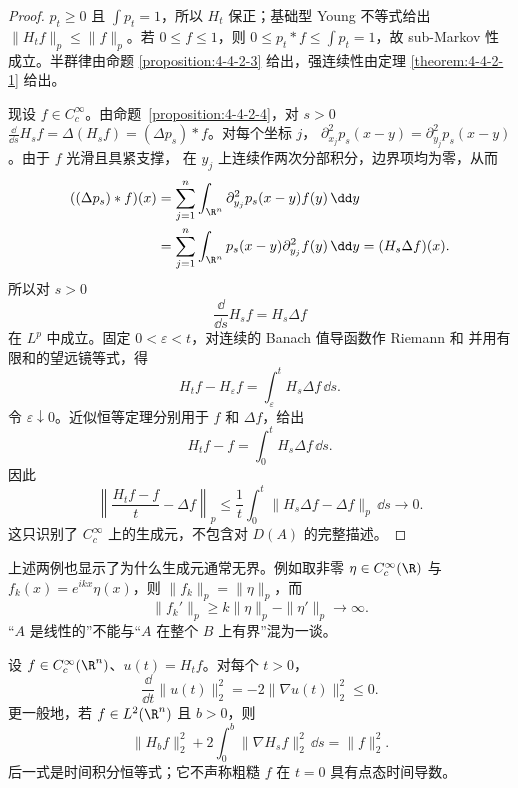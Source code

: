 \begin{proof}
$p_t\ge0$ 且 $\int p_t=1$，所以 $H_t$ 保正；基础型 Young 不等式给出
$\|H_tf\|_p\le\|f\|_p$。若 $0\le f\le1$，则
$0\le p_t*f\le\int p_t=1$，故 sub-Markov 性成立。半群律由命题
\ref{proposition:4-4-2-3} 给出，强连续性由定理
\ref{theorem:4-4-2-1} 给出。

现设 $f\in C_c^\infty$。由命题~\ref{proposition:4-4-2-4}，对 $s>0$
$\frac{\dd}{\dd s}H_sf=\Delta(H_sf)=(\Delta p_s)*f$。对每个坐标 $j$，
$\partial_{x_j}^2p_s(x-y)=\partial_{y_j}^2p_s(x-y)$。由于 $f$ 光滑且具紧支撑，
在 $y_j$ 上连续作两次分部积分，边界项均为零，从而
\begin{align*}
 ((\Delta p_s)*f)(x)
 &=\sum_{j=1}^n\int_{\R^n}
   \partial_{y_j}^2p_s(x-y)f(y)\,\dd y\\
 &=\sum_{j=1}^n\int_{\R^n}
   p_s(x-y)\partial_{y_j}^2f(y)\,\dd y
 =(H_s\Delta f)(x).
\end{align*}
所以对 $s>0$
\[
 \frac{\dd}{\dd s}H_sf=H_s\Delta f
\]
在 $L^p$ 中成立。固定 $0<\varepsilon<t$，对连续的 Banach 值导函数作 Riemann 和
并用有限和的望远镜等式，得
\[
 H_tf-H_\varepsilon f=\int_\varepsilon^tH_s\Delta f\,\dd s.
\]
令 $\varepsilon\downarrow0$。近似恒等定理分别用于 $f$ 和 $\Delta f$，给出
\begin{equation}\label{eq:4-4-3-heat-difference-integral}
 H_tf-f=\int_0^tH_s\Delta f\,\dd s.
\end{equation}
因此
\[
 \left\|\frac{H_tf-f}{t}-\Delta f\right\|_p
 \le\frac1t\int_0^t\|H_s\Delta f-\Delta f\|_p\,\dd s
 \longrightarrow0.
\]
这只识别了 $C_c^\infty$ 上的生成元，不包含对 $D(A)$ 的完整描述。
\end{proof}

上述两例也显示了为什么生成元通常无界。例如取非零
$\eta\in C_c^\infty(\R)$ 与 $f_k(x)=e^{ikx}\eta(x)$，则 $\|f_k\|_p=\|\eta\|_p$，而
\[
 \|f_k'\|_p\ge k\|\eta\|_p-\|\eta'\|_p\longrightarrow\infty.
\]
“$A$ 是线性的”不能与“$A$ 在整个 $B$ 上有界”混为一谈。

\begin{theorem}[热能量恒等式]\label{theorem:4-4-3-3}
设 $f\in C_c^\infty(\R^n)$、$u(t)=H_tf$。对每个 $t>0$，
\[
 \frac{\dd}{\dd t}\|u(t)\|_2^2
 =-2\|\nabla u(t)\|_2^2\le0.
\]
更一般地，若 $f\in L^2(\R^n)$ 且 $b>0$，则
\begin{equation}\label{eq:4-4-3-integrated-energy}
 \|H_bf\|_2^2+2\int_0^b\|\nabla H_sf\|_2^2\,\dd s
 =\|f\|_2^2.
\end{equation}
后一式是时间积分恒等式；它不声称粗糙 $f$ 在 $t=0$ 具有点态时间导数。
\end{theorem}


